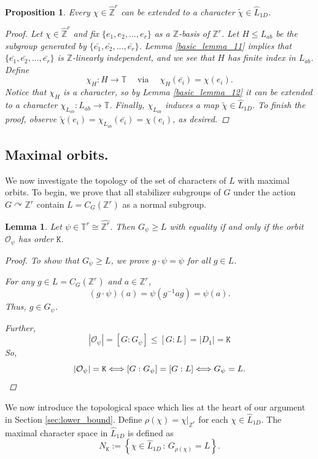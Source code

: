 \documentclass[11pt, twoside]{amsart}
\newcommand{\te}[1]{\operatorname{#1}}
\newcommand{\zn}{\mathbb{Z}}
\newcommand{\mc}{\mathcal}
\newcommand{\mt}{\mathtt}
\newcommand{\wh}{\widehat}
\renewcommand{\l}{\left}
\renewcommand{\r}{\right}
\newtheorem{prop}[thm]{Proposition}
\newtheorem{lemma}[thm]{Lemma}
\theoremstyle{definition}
\newcommand{\B}{\mathbb}
\newcommand{\Z}{\B{Z}}
\newcommand{\TT}{\mathbb{T}}
\begin{document}
      
\begin{prop}\label{extension_of_char}
    Every $\chi\in \widehat{\Z}^r$ can be extended to a character $\widetilde{\chi}\in \wh{L}_{1D}$.
    \begin{proof}
        Let $\chi\in \widehat{\Z}^r$ and fix $\{e_1,e_2,...,e_r\}$ as a $\Z$-basis of $\Z^r$. Let $H\leq L_{ab}$ be the subgroup generated by $\{\bar{e_1},\bar{e_2},...,\bar{e_r}\}$. Lemma \ref{basic_lemma_11} implies that $\{\bar{e_1},\bar{e_2},...,\bar{e_r}\}$ is $\Z$-linearly independent, and we see that $H$ has finite index in $L_{ab}$. Define
        \[\chi_H:H\rightarrow \TT\quad \te{via}\quad \chi_H(\bar{e_i})=\chi(e_i).\]
        Notice that $\chi_H$ is a character, so by Lemma \ref{basic_lemma_12} it can be extended to a character $\chi_{L_{ab}}:L_{ab}\rightarrow \TT$. Finally, $\chi_{L_{ab}}$ induces a map $\widetilde{\chi}\in \wh{L}_{1D}$. To finish the proof, observe $\widetilde{\chi}(e_i)=\chi_{L_{ab}}(\bar{e_i})=\chi(e_i)$, as desired.
    \end{proof}
\end{prop}


\subsection{Maximal orbits.} 
We now investigate the topology of the set of characters of $L$
with maximal orbits. To begin, we prove that all stabilizer subgroups of $G$ under the action $G\curvearrowright \Z^r$ contain $L=C_G(\zn^r)$ as a normal subgroup.

\begin{lemma}\label{stabilizers_in_virtually_abelian_case}
  Let $\psi\in \TT^r\cong \widehat{\Z^r}$. Then $G_{\psi}\geq L$ with equality if and only if the orbit $\mc{O}_{\psi}$ has order $\mt{K}$.
  \begin{proof}
      To show that $G_{\psi}\geq L$, we prove $g\cdot \psi=\psi$ for all $g\in L$.
      
     For any $g\in L=C_G(\zn^r)$ and $a\in \Z^r$,
      \[(g\cdot \psi)(a)=\psi(g^{-1}ag)=\psi(a).\]
     Thus, $g\in G_{\psi}$. \par
     Further,
    \[|\mc{O}_{\psi}|=[G:G_{\psi}]\leq [G:L]=|D_1|=\mt{K}\]
      So, 
      \[|\mc{O}_{\psi}|=\mt{K}\Longleftrightarrow [G:G_{\psi}]=[G:L]\Longleftrightarrow G_{\psi}=L.\qedhere\]
  \end{proof}
\end{lemma}

We now introduce the topological space which lies at the heart of our argument in Section \ref{sec:lower_bound}. Define $\rho(\chi)=\chi|_{\zn^r}$ for each $\chi\in \wh{L}_{1D}$. The maximal character space in $\wh{L}_{1D}$ is defined as
\begin{equation}\label{eqn:Nk}
N_{\mt{K}}:=\l\{\chi \in \wh{L}_{1D}\,\colon\, G_{\rho(\chi)}=L\r\}.
\end{equation}
\end{document}

